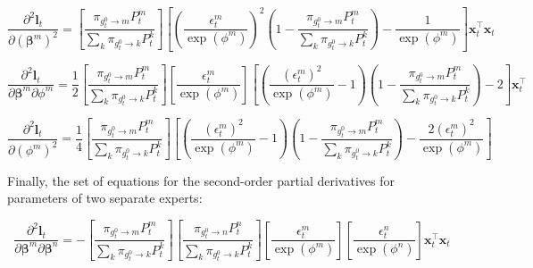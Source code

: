 \documentclass[12pt]{article}
\newcommand{\gateprod}[2]{\pi_{#1 \longrightarrow #2}}
\theoremstyle{definition}
\begin{document}
\begin{equation} 
  \frac{\partial^{2} \boldsymbol{l}_{t}}{\partial (\boldsymbol{\beta}^{m})^{2}} =  \left[ \frac{\gateprod{g^{0}_{t}}{m} P^{m}_{t}}{ \sum_{k} \gateprod{g^{0}_{t}}{k} P^{k}_{t}} \right] \left[ \left( \frac{ \epsilon^{m}_{t} }{ \exp( \phi^{m}) } \right)^{2} \left( 1 - \frac{\gateprod{g^{0}_{t}}{m} P^{m}_{t}}{ \sum_{k} \gateprod{g^{0}_{t}}{k} P^{k}_{t}} \right) - \frac{1}{ \exp( \phi^{m} ) }  \right] \boldsymbol{x}_{t}^{\top} \boldsymbol{x}_{t}
\end{equation}

\begin{equation} 
  \frac{\partial^{2} \boldsymbol{l}_{t}}{\partial \boldsymbol{\beta}^{m} \partial \phi^{m}} =  \frac{1}{2} \left[ \frac{\gateprod{g^{0}_{t}}{m} P^{m}_{t}}{ \sum_{k} \gateprod{g^{0}_{t}}{k} P^{k}_{t}} \right] \left[ \frac{\epsilon^{m}_{t}}{\exp(\phi^{m})} \right] \left[ \left( \frac{ ( \epsilon^{m}_{t} )^{2} }{ \exp( \phi^{m}) } - 1 \right) \left( 1 - \frac{\gateprod{g^{0}_{t}}{m} P^{m}_{t}}{ \sum_{k} \gateprod{g^{0}_{t}}{k} P^{k}_{t}} \right) - 2  \right] \boldsymbol{x}_{t}^{\top}
\end{equation}

\begin{equation} 
  \frac{\partial^{2} \boldsymbol{l}_{t}}{\partial (\phi^{m})^{2}} =  \frac{1}{4} \left[ \frac{\gateprod{g^{0}_{t}}{m} P^{m}_{t}}{ \sum_{k} \gateprod{g^{0}_{t}}{k} P^{k}_{t}} \right]  \left[ \left( \frac{ ( \epsilon^{m}_{t} )^{2} }{ \exp( \phi^{m}) } - 1 \right) \left( 1 - \frac{\gateprod{g^{0}_{t}}{m} P^{m}_{t}}{ \sum_{k} \gateprod{g^{0}_{t}}{k} P^{k}_{t}} \right) - \frac{ 2 (\epsilon^{m}_{t})^{2} }{ \exp(\phi^{m}) }  \right] 
\end{equation}

Finally, the set of equations for the second-order partial derivatives for parameters of two separate experts:

\begin{equation} 
  \frac{\partial^{2} \boldsymbol{l}_{t}}{\partial \boldsymbol{\beta}^{m} \partial \boldsymbol{\beta}^{n} } = - \left[ \frac{\gateprod{g^{0}_{t}}{m} P^{m}_{t}}{ \sum_{k} \gateprod{g^{0}_{t}}{k} P^{k}_{t}} \right] \left[ \frac{\gateprod{g^{0}_{t}}{n} P^{n}_{t}}{ \sum_{k} \gateprod{g^{0}_{t}}{k} P^{k}_{t}} \right]  \left[ \frac{\epsilon^{m}_{t}}{\exp(\phi^{m})} \right] \left[ \frac{\epsilon^{n}_{t}}{\exp(\phi^{n})} \right] \boldsymbol{x}_{t}^{\top} \boldsymbol{x}_{t} 
\end{equation}
\end{document}
